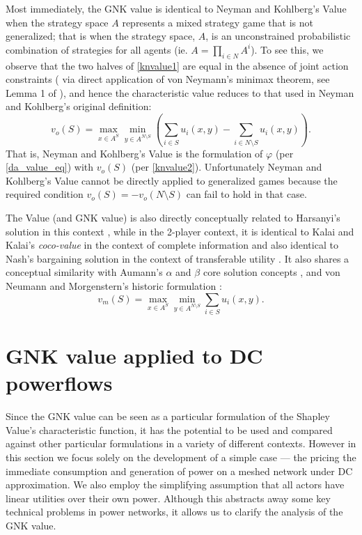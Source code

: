 Most immediately, the GNK value is identical to Neyman and Kohlberg's Value \cite{value2} when the strategy space $A$ represents a mixed strategy game that is not generalized; 
 that is when the strategy space, $A$, is an unconstrained probabilistic combination of strategies for all agents (ie. $A = \prod_{i\in N}A^i$).
To see this, we observe that the two halves of \eqref{knvalue1} are equal in the absence of joint action constraints (%
via direct application of von Neymann's minimax theorem, see Lemma 1 of \cite{value2}), 
and hence the characteristic value reduces to that used in Neyman and Kohlberg's original definition:
\begin{equation}\label{knvalue2}v_o(S) = \max_{x\in A^S}\min_{y\in A^{N\setminus S}} \left(\sum_{i\in S} u_i(x,y) - \sum_{i\in N\setminus S} u_i(x,y) \right).\end{equation}
%
That is, Neyman and Kohlberg's Value is the formulation of $\varphi$ (per \eqref{da_value_eq}) 
with $v_o(S)$ (per \eqref{knvalue2}).
Unfortunately Neyman and Kohlberg's Value cannot be directly applied to generalized games because the required condition $v_o(S)=-v_o(N\setminus S)$ can fail to hold in that case. 

The Value (and GNK value) is also directly conceptually related to Harsanyi's solution in this context \cite{values3},
while in the 2-player context, it is identical to Kalai and Kalai's \textit{coco-value} in the context of complete information \cite{kalai1,Kalai2010,value2} 
and also identical to Nash's bargaining solution in the context of transferable utility \cite{nash2,value2}.
It also shares a conceptual similarity with Aumann's $\alpha$ and $\beta$ core solution concepts \cite{aumann1961core}, and von Neumann and Morgenstern's historic formulation \cite{1944,KOHLBERG2018139,values3}:
\begin{equation}\label{knvalue3}v_m(S) = \max_{x\in A^S}\min_{y\in A^{N\setminus S}} \sum_{i\in S} u_i(x,y).\end{equation}


\section{GNK value applied to DC powerflows}\label{more_involved}

Since the GNK value can be seen as a particular formulation of the Shapley Value's characteristic function, it has the potential to be used and compared against other particular formulations in a variety of different contexts.
However in this section we focus solely on the development of a simple case --- the pricing the immediate consumption and generation of power on a meshed network under DC approximation.
We also employ the simplifying assumption that all actors have linear utilities over their own power.
Although this abstracts away some key technical problems in power networks, it allows us to clarify the analysis of the GNK value.

